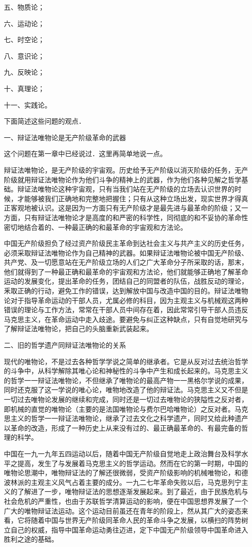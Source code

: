 五、物质论；

六、运动论；

七、时空论；

八、意识论；

九、反映论；

十、真理论；

十一、实践论。

下面简述这些问题的观点．

一、辩证法唯物论是无产阶级革命的武器

这个问题在第一章中已经说过．这里再简单地说一点。

辩证法唯物论，是无产阶级的宇宙观。历史给予无产阶级以消灭阶级的任务，无产阶级就用辩证法唯物论作为他们斗争的精神上的武器，作为他们各种见解之哲学基础。辩证法唯物论这种宇宙观，只有当我们站在无产阶级的立场去认识世界的时候，才能够被我们正确地和完整地把握住；只有从这种立场出发，现实世界才得真正客观地被认识。这是因为一方面只有无产阶级才是最先进与最革命的阶级；又一方面，只有辩证法唯物论才是高度的和严密的科学性，同彻底的和不妥协的革命性密切地结合着的、一种最正确的和最革命的宇宙观和方法论。

中国无产阶级担负了经过资产阶级民主革命到达社会主义与共产主义的历史任务，必须采取辩证法唯物论作为自己精神的武器。如果辩证法唯物论被中国无产阶级、共产党、及一切愿意站在无产阶级立场的人们之广大革命分子所采取的话，那末，他们就得到了一种最正确和最革命的宇宙观和方法论，他们就能够正确地了解革命运动的发展变化，提出革命的任务，团结自己的同盟者的队伍，战胜反动的理论，釆取正确的行动，避免工作的错误，达到解放中国与改造中国的目的。辩证法唯物论对于指导革命运动的干部人员，尤属必修的科目，因为主观主义与机械观这两种错误的理论与工作方法，常常在干部人员中间存在着，因此常常引导干部人员违反马克思主义，在革命运动中走入歧途。要避免与纠正这种缺点，只有自觉地研究与了解辩证法唯物论，把自己的头脑重新武装起来。

二、旧的哲学遗产同辩证法唯物论的关系

现代的唯物论，不是过去各种哲学学说之简单的继承者。它是从反对过去统治哲学的斗争中，从科学解除其唯心论和神秘性的斗争中产生和成长起来的。马克思主义的哲学一一辩证法唯物论，不但继承了唯物论的最高产物一一黑格尔学说的成果，同时还克服了这一学说的唯心论，唯物地改造了他的辩证法。马克思主义又不但是一切过去唯物论发展的继续和完成，同时还是一切过去唯物论的狭隘性之反对者，即机械的直觉的唯物论（主要的是法国唯物论与费尔巴哈唯物论）之反对者。马克思主义的哲学一一辩证法唯物论，继承了过去文化之科学遗产，同时又给此种遗产以革命的改造，形成了一种历史上从来没有过的、最正确最革命的、有最完备的哲理的科学。

中国在一九一九年五四运动以后，随着中国无产阶级自觉地走上政治舞台及科学水平之提高，发生了与发展着马克思主义的哲学运动。然而在它的第一时期，中国的唯物论思潮中，唯物辩证法的了解还很微弱，受资产阶级影响的机械唯物论，和德波林派的主观主义风气占着主要的成分。一九二七年革命失败以后，马克思列宁主义的了解进了一步，唯物辩证法的思想逐渐发展起来。到了最近，由于民族危机与社会危机的严重性，也由于苏联哲学清算运动的影响，便在中国思想界发展了一个广大的唯物辩证法运动。这个运动目前虽还在青年的阶段上，然从其广大的姿态来看，它将随着中国与世界无产阶级同革命人民的革命斗争之发展，以横扫的阵势树立自己的权威，指导中国革命运动勇往迈进，定下中国无产阶级领导中国革命进入胜利之途的基础。

